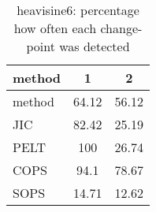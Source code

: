 \begin{table}[ht]
\centering
\begin{tabular}{l|cc}
  \hline
method & 1 & 2 \\ 
  \hline
method &  64.12 &  56.12 \\ 
  JIC &  82.42 &  25.19 \\ 
  PELT &    100 &  26.74 \\ 
  COPS &   94.1 &  78.67 \\ 
  SOPS &  14.71 &  12.62 \\ 
   \hline
\end{tabular}
\caption{heavisine6: percentage how often each change-point was detected} 
\label{tab:heavisine6Detections}
\end{table}
